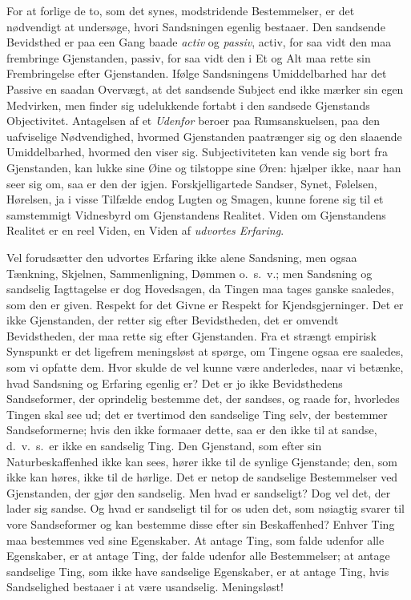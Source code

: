 \documentclass[12pt]{book}
\newcommand{\apage}[1]{\marginnote{\footnotesize\textit{[#1]}}}
\begin{document}
For at forlige de to, som det synes, modstridende Bestemmelser, er det
nødvendigt at undersøge, hvori Sandsningen egenlig bestaaer. Den
sandsende Bevidsthed er paa een Gang baade \emph{activ} og \emph{passiv}, activ, for saa
vidt den maa frembringe Gjenstanden, passiv, for saa vidt den i Et og Alt
maa rette sin Frembringelse efter Gjenstanden. Ifølge Sandsningens
Umiddelbarhed har det Passive en saadan Overvægt, at det sandsende Subject
end ikke mærker sin egen Medvirken, men finder sig udelukkende fortabt i
den sandsede Gjenstands Objectivitet. Antagelsen af et \emph{Udenfor} beroer paa
Rumsanskuelsen, paa den uafviselige Nødvendighed, hvormed Gjenstanden
paatrænger sig og den slaaende Umiddelbarhed, hvormed den viser sig.
Subjectiviteten kan vende sig bort fra Gjenstanden, kan lukke sine Øine og
tilstoppe sine Øren: hjælper ikke, naar han seer sig om, saa er den der
igjen. Forskjelligartede Sandser, Synet, Følelsen, Hørelsen, ja i visse
Tilfælde endog Lugten og Smagen, kunne forene sig til et samstemmigt
Vidnesbyrd om Gjenstandens Realitet. Viden om Gjenstandens  \apage{12} Realitet er en
reel Viden, en Viden af \emph{udvortes Erfaring}.

Vel forudsætter den udvortes Erfaring ikke alene Sandsning, men ogsaa
Tænkning, Skjelnen, Sammenligning, Dømmen o.\ s.\ v.; men Sandsning og
sandselig Iagttagelse er dog Hovedsagen, da Tingen maa tages ganske
saaledes, som den er given. Respekt for det Givne er Respekt for
Kjendsgjerninger. Det er ikke Gjenstanden, der retter sig efter
Bevidstheden, det er omvendt Bevidstheden, der maa rette sig efter
Gjenstanden. Fra et strængt empirisk Synspunkt er det ligefrem
meningsløst at spørge, om Tingene ogsaa ere saaledes, som vi opfatte dem.
Hvor skulde de vel kunne være anderledes, naar vi betænke, hvad Sandsning
og Erfaring egenlig er? Det er jo ikke Bevidsthedens Sandseformer, der
oprindelig bestemme det, der sandses, og raade for, hvorledes Tingen skal
see ud; det er tvertimod den sandselige Ting selv, der bestemmer
Sandseformerne; hvis den ikke formaaer dette, saa er den ikke til at
sandse, d.\ v.\ s.\ er ikke en sandselig Ting. Den Gjenstand, som efter sin
Naturbeskaffenhed ikke kan sees, hører ikke til de synlige Gjenstande;
den, som ikke kan høres, ikke til de hørlige. Det er netop de sandselige
Bestemmelser ved Gjenstanden, der gjør den sandselig. Men hvad er
sandseligt? Dog vel det, der lader sig sandse. Og hvad er sandseligt til
for os uden det, som nøiagtig svarer til vore Sandseformer og kan bestemme
disse efter sin Beskaffenhed? Enhver Ting maa bestemmes ved sine
Egenskaber. At antage Ting, som falde udenfor alle Egenskaber, er \apage{13} at
antage Ting, der falde udenfor alle Bestemmelser; at antage sandselige
Ting, som ikke have sandselige Egenskaber, er at antage Ting, hvis
Sandselighed bestaaer i at være usandselig. Meningsløst!
\end{document}
